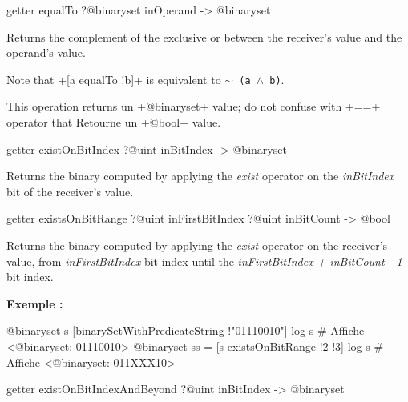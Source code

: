 \begin{galgas3box}
getter equalTo ?@binaryset inOperand -> @binaryset
\end{galgas3box}

Returns the complement of the exclusive or between the receiver's value and the operand's value.

Note that \ggst+[a equalTo !b]+ is equivalent to \texttt{$\sim$ (a $\wedge$ b)}.

This operation returns un \ggst+@binaryset+ value; do not confuse with \ggst+==+ operator that Retourne un \ggst+@bool+ value.








\begin{galgas3box}
getter existOnBitIndex ?@uint inBitIndex -> @binaryset
\end{galgas3box}

Returns the binary computed by applying the \emph{exist} operator on the \emph{inBitIndex} bit of the receiver's value.







\begin{galgas3box}
getter existsOnBitRange ?@uint inFirstBitIndex ?@uint inBitCount -> @bool
\end{galgas3box}


Returns the binary computed by applying the \emph{exist} operator on the receiver's value, from \emph{inFirstBitIndex} bit index until the \emph{inFirstBitIndex + inBitCount - 1} bit index.


\textbf{Exemple :}
\begin{galgas3}
@binaryset s [binarySetWithPredicateString !"01110010"]
log s # Affiche <@binaryset: 01110010>
@binaryset ss = [s existsOnBitRange !2 !3]
log s # Affiche <@binaryset: 011XXX10>
\end{galgas3}








\begin{galgas3box}
getter existOnBitIndexAndBeyond ?@uint inBitIndex -> @binaryset
\end{galgas3box}

